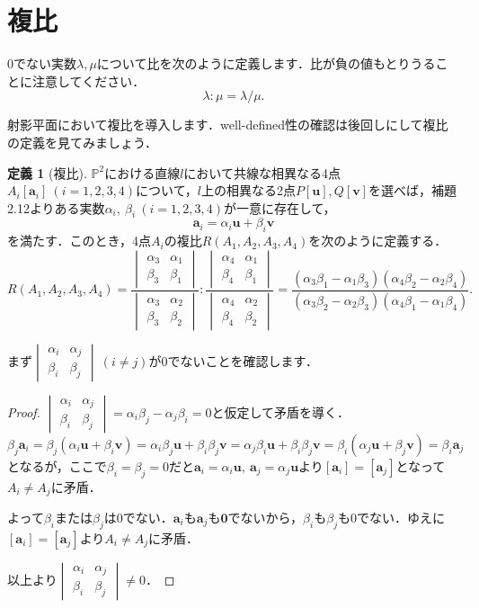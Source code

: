 \documentclass{jsarticle}
\theoremstyle{definition}
\newtheorem{definition}[theorem]{定義}
\numberwithin{theorem}{section}
\numberwithin{equation}{section}
\begin{document}
\section{複比}
0でない実数$\lambda,\mu$について比を次のように定義します．比が負の値もとりうることに注意してください．
$$\lambda: \mu =\lambda/\mu.$$
\par 射影平面において複比を導入します．well-defined性の確認は後回しにして複比の定義を見てみましょう．
\begin{definition}[複比]
$\mathbb{P}^2$における直線$l$において共線な相異なる4点$A_i[\bm{a}_i]\ (i=1,2,3,4)$について，$l$上の相異なる2点$P[\bm{u}],Q[\bm{v}]$を選べば，補題2.12よりある実数$\alpha_i,\ \beta_i \ (i=1,2,3,4)$が一意に存在して，
$$\bm{a}_i=\alpha_i \bm{u}+ \beta_i \bm{v}$$
を満たす．このとき，4点$A_i$の複比$R(A_1,A_2,A_3,A_4)$を次のように定義する．
$$R(A_1,A_2,A_3,A_4)=\frac{\begin{vmatrix}
\alpha_3 & \alpha_1
\\ \beta_3 & \beta_1
\end{vmatrix}}{\begin{vmatrix}
    \alpha_3 & \alpha_2
\\ \beta_3 & \beta_2
\end{vmatrix}}:\frac{\begin{vmatrix}
    \alpha_4 & \alpha_1
\\ \beta_4 & \beta_1
\end{vmatrix}}{\begin{vmatrix}
   \alpha_4 & \alpha_2
\\ \beta_4 & \beta_2
\end{vmatrix}}=\frac{(\alpha_3 \beta_1 -\alpha_1 \beta_3)(\alpha_4 \beta_2 -\alpha_2 \beta_4)}{(\alpha_3 \beta_2 -\alpha_2 \beta_3)(\alpha_4 \beta_1 -\alpha_1 \beta_4)}.$$
\end{definition}
まず$\begin{vmatrix}
   \alpha_i & \alpha_j
\\ \beta_i & \beta_j
\end{vmatrix}\ (i \neq j)$が0でないことを確認します．
\begin{proof}
    $\begin{vmatrix}
   \alpha_i & \alpha_j
\\ \beta_i & \beta_j
\end{vmatrix}=\alpha_i \beta_j -\alpha_j \beta_i=0$と仮定して矛盾を導く．
$$\beta_j \bm{a}_i=\beta_j(\alpha_i \bm{u}+ \beta_i \bm{v})=\alpha_i \beta_j \bm{u}+ \beta_i \beta_j \bm{v}=\alpha_j \beta_i \bm{u}+ \beta_i \beta_j \bm{v}=\beta_i(\alpha_j \bm{u}+ \beta_j \bm{v})=\beta_i \bm{a}_j$$
となるが，ここで$\beta_i=\beta_j=0$だと$\bm{a}_i=\alpha_i \bm{u},\ \bm{a}_j=\alpha_j \bm{u}$より$[\bm{a}_i]=[\bm{a}_j]$となって$A_i \neq A_j$に矛盾．
\par よって$\beta_i$または$\beta_j$は0でない．$\bm{a}_i$も$\bm{a}_j$も$\bm{0}$でないから，$\beta_i$も$\beta_j$も0でない．ゆえに$[\bm{a}_i]=[\bm{a}_j]$より$A_i \neq A_j$に矛盾．
\par 以上より$\begin{vmatrix}
   \alpha_i & \alpha_j
\\ \beta_i & \beta_j
\end{vmatrix}\neq 0$．
\end{proof}
\end{document}
